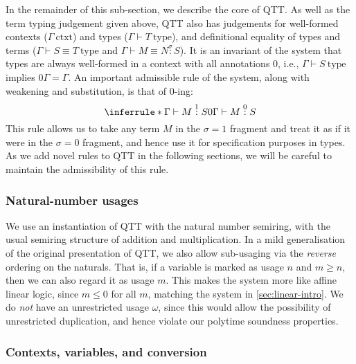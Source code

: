 \documentclass[acmsmall,screen]{acmart}
\newcommand{\istype}{\mathrm{type}}
\newcommand{\isctxt}{\mathrm{ctxt}}
\begin{document}
In the remainder of this sub-section, we describe the core of QTT. As
well as the term typing judgement given above, QTT also has judgements
for well-formed contexts ($\Gamma~\isctxt$) and types
($\Gamma \vdash T~\istype$), and definitional equality of types and
terms ($\Gamma \vdash S \equiv T~\istype$ and
$\Gamma \vdash M \equiv N \stackrel\sigma: S$). It is an invariant of
the system that types are always well-formed in a context with all
annotations $0$, i.e., $\Gamma \vdash S~\istype$ implies
$0\Gamma = \Gamma$. An important admissible rule of the system, along
with weakening and substitution, is that of $0$-ing:
\begin{displaymath}
  \inferrule*
  {\Gamma \vdash M \stackrel1: S}
  {0\Gamma \vdash M \stackrel0: S}
\end{displaymath}
This rule allows us to take any term $M$ in the $\sigma = 1$ fragment
and treat it as if it were in the $\sigma = 0$ fragment, and hence use
it for specification purposes in types. As we add novel rules to QTT
in the following sections, we will be careful to maintain the
admissibility of this rule.

\subsubsection{Natural-number usages}

We use an instantiation of QTT with the natural number semiring, with
the usual semiring structure of addition and multiplication. In a mild
generalisation of the original presentation of QTT, we also allow
sub-usaging via the \emph{reverse} ordering on the naturals. That is,
if a variable is marked as usage $n$ and $m \geq n$, then we can also
regard it as usage $m$. This makes the system more like affine linear
logic, since $m \leq 0$ for all $m$, matching the system in
\autoref{sec:linear-intro}. We do \emph{not} have an unrestricted
usage $\omega$, since this would allow the possibility of unrestricted
duplication, and hence violate our polytime soundness properties.

\subsubsection{Contexts, variables, and conversion}
\end{document}
